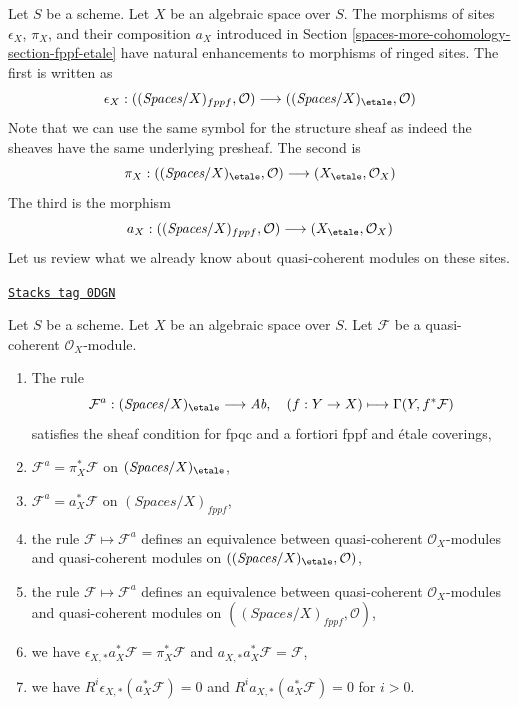 \medskip\noindent
Let $S$ be a scheme. Let $X$ be an algebraic space over $S$.
The morphisms of sites $\epsilon_X$, $\pi_X$, and
their composition $a_X$ introduced in Section \ref{spaces-more-cohomology-section-fppf-etale}
have natural enhancements to morphisms of ringed sites. The first
is written as
$$
\epsilon_X :
((\textit{Spaces}/X)_{fppf}, \mathcal{O})
\longrightarrow
((\textit{Spaces}/X)_\etale, \mathcal{O})
$$
Note that we can use the same symbol for the structure sheaf as indeed
the sheaves have the same underlying presheaf. The second is
$$
\pi_X :
((\textit{Spaces}/X)_\etale, \mathcal{O})
\longrightarrow
(X_\etale, \mathcal{O}_X)
$$
The third is the morphism
$$
a_X :
((\textit{Spaces}/X)_{fppf}, \mathcal{O})
\longrightarrow
(X_\etale, \mathcal{O}_X)
$$
Let us review what we already know about quasi-coherent
modules on these sites.

\begin{lemma}
\label{spaces-more-cohomology-lemma-review-quasi-coherent}
\href{https://stacks.math.columbia.edu/tag/0DGN}{\texttt{Stacks tag 0DGN}}

Let $S$ be a scheme. Let $X$ be an algebraic space over $S$.
Let $\mathcal{F}$ be a quasi-coherent $\mathcal{O}_X$-module.
\begin{enumerate}
\item The rule
$$
\mathcal{F}^a : (\textit{Spaces}/X)_\etale \longrightarrow \textit{Ab},\quad
(f : Y \to X) \longmapsto \Gamma(Y, f^*\mathcal{F})
$$
satisfies the sheaf condition for fpqc and a fortiori
fppf and \'etale coverings,
\item $\mathcal{F}^a = \pi_X^*\mathcal{F}$ on $(\textit{Spaces}/X)_\etale$,
\item $\mathcal{F}^a = a_X^*\mathcal{F}$ on $(\textit{Spaces}/X)_{fppf}$,
\item the rule $\mathcal{F} \mapsto \mathcal{F}^a$ defines
an equivalence between quasi-coherent $\mathcal{O}_X$-modules
and quasi-coherent modules on
$((\textit{Spaces}/X)_\etale, \mathcal{O})$,
\item the rule $\mathcal{F} \mapsto \mathcal{F}^a$ defines
an equivalence between quasi-coherent $\mathcal{O}_X$-modules
and quasi-coherent modules on
$((\textit{Spaces}/X)_{fppf}, \mathcal{O})$,
\item we have $\epsilon_{X, *}a_X^*\mathcal{F} = \pi_X^*\mathcal{F}$
and $a_{X, *}a_X^*\mathcal{F} = \mathcal{F}$,
\item we have $R^i\epsilon_{X, *}(a_X^*\mathcal{F}) = 0$
and $R^ia_{X, *}(a_X^*\mathcal{F}) = 0$ for $i > 0$.
\end{enumerate}
\end{lemma}

